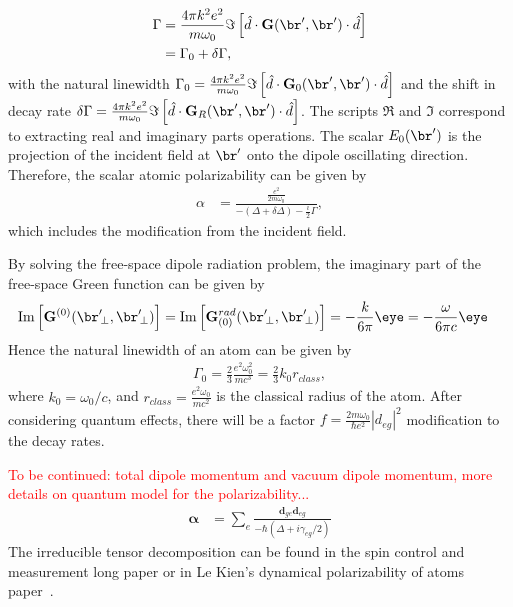 \documentclass[]{report}
\begin{document}
\begin{align}
\Gamma &= \frac{4\pi k^2e^2}{m\omega_0}\Im\left[\hat{d}\cdot\mathbf{G}(\br',\br')\cdot \hat{d}\right]\\
&= \Gamma_0 + \delta \Gamma,
\end{align}
with the natural linewidth $ \Gamma_0=\frac{4\pi k^2 e^2}{m\omega_0}\Im\left[\hat{d}\cdot\mathbf{G}_0(\br',\br')\cdot \hat{d}\right] $ and the shift in decay rate $ \delta\Gamma=\frac{4\pi k^2e^2}{m\omega_0}\Im\left[\hat{d}\cdot\mathbf{G}_R(\br',\br')\cdot \hat{d}\right] $. The scripts $ \Re $ and $ \Im $ correspond to extracting real and imaginary parts operations. The scalar $ E_0(\br') $ is the projection of the incident field at $ \br' $ onto the dipole oscillating direction. Therefore, the scalar atomic polarizability can be given by
\begin{align}
\alpha &= \frac{\frac{e^2}{2m\omega_0}}{-(\Delta+\delta \Delta)-\frac{i}{2}\Gamma},
\end{align}
which includes the modification from the incident field. 

By solving the free-space dipole radiation problem, the imaginary part of the free-space Green function can be given by
\begin{align}
\mathrm{Im}\left[ \mathbf{G}^{(0)} (\br^\prime\!_\perp, \br^\prime\!_\perp) \right] &= \mathrm{Im} 
\left[ \mathbf{G}^{rad}_{(0)}(\br'\!_\perp,\br'\!_\perp)\right]  = -\frac{ 
k}{6\pi}\eye = -\frac{ 
\omega}{6\pi c}\eye
\end{align}
Hence the natural linewidth of an atom can be given by
\begin{align}
\Gamma_0 = \frac{2}{3}\frac{e^2\omega_0^2}{mc^3}=\frac{2}{3}k_0r_{class},
\end{align}
where $ k_0=\omega_0/c $, and $ r_{class}= \frac{e^2\omega_0}{mc^2}$ is the classical radius of the atom. After considering quantum effects, there will be a factor $ f=\frac{2m\omega_0}{\hbar e^2}|d_{eg}|^2 $ modification to the decay rates. 

\textcolor{red}{To be continued: total dipole momentum and vacuum dipole momentum, more details on quantum model for the polarizability...}
\begin{align}
\boldsymbol{\alpha} &= \sum_e \frac{\mathbf{d}_{ge}\mathbf{d}_{eg}}{-\hbar(\Delta+i\gamma_{eg}/2)}
\end{align}
The irreducible tensor decomposition can be found in the spin control and measurement long paper\cite{Deutsch2010a} or in Le Kien's dynamical polarizability of atoms paper~\cite{LeKien2013}. 
\end{document}
